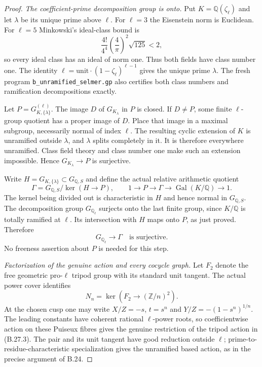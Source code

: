 \begin{proof}
\emph{The coefficient-prime decomposition group is onto.}
Put $K=\mathbb Q(\zeta_\ell)$ and let $\lambda$
be its unique prime above $\ell$.
For $\ell=3$ the Eisenstein norm is Euclidean.
For $\ell=5$ Minkowski's ideal-class bound is
\[
 \frac{4!}{4^4}\left(\frac4\pi\right)^2\sqrt{125}<2,
\]
so every ideal class has an ideal of norm one.
Thus both fields have class number one.
The identity
$\ell=\text{unit}\cdot(1-\zeta_\ell)^{\ell-1}$
gives the unique prime $\lambda$.
The fresh program \texttt{b\_unramified\_selmer.gp}
also certifies both class numbers and ramification
decompositions exactly.

Let $P=G_{K,\{\lambda\}}^{(\ell)}$.
The image $D$ of $G_{K_\lambda}$ in $P$ is closed.
If $D\ne P$, some finite $\ell$-group quotient
has a proper image of $D$. Place that image in
a maximal subgroup, necessarily normal of index
$\ell$. The resulting cyclic extension of $K$
is unramified outside $\lambda$, and $\lambda$
splits completely in it. It is therefore everywhere
unramified. Class field theory and class number
one make such an extension impossible.
Hence $G_{K_\lambda}\to P$ is surjective.

Write $H=G_{K,\{\lambda\}}\subset G_{\mathbb Q,S}$
and define the actual relative arithmetic quotient
\[
 \Gamma=G_{\mathbb Q,S}/
         \ker(H\longrightarrow P),\qquad
 1\longrightarrow P\longrightarrow\Gamma
       \longrightarrow\operatorname{Gal}(K/\mathbb Q)
       \longrightarrow1.
                                                               \tag{B.27.1}
\]
The kernel being divided out is characteristic in
$H$ and hence normal in $G_{\mathbb Q,S}$.
The decomposition group $G_{\mathbb Q_\ell}$
surjects onto the last finite group, since
$K/\mathbb Q$ is totally ramified at $\ell$.
Its intersection with $H$ maps onto $P$, as just
proved. Therefore
\[
             G_{\mathbb Q_\ell}\longrightarrow\Gamma
                  \quad\text{is surjective}.                  \tag{B.27.2}
\]
No freeness assertion about $P$ is needed for this step.

\emph{Factorization of the genuine action and every cocycle graph.}
Let $F_2$ denote the free geometric pro-$\ell$
tripod group with its standard unit tangent.
The actual power cover identifies
\[
 N_n=\ker\left(F_2\longrightarrow(\mathbb Z/n)^2\right).
                                                               \tag{B.27.3}
\]
At the chosen cusp one may write
$X/Z=-s$, $t=s^n$ and $Y/Z=-(1-s^n)^{1/n}$.
The leading constants have coherent rational
$\ell$-power roots, so coefficientwise action on
these Puiseux fibres gives the genuine restriction
of the tripod action in (B.27.3).
The pair and its unit tangent have good reduction
outside $\ell$; prime-to-residue-characteristic
specialization gives the unramified based action,
as in the precise argument of B.24.


\end{proof}
